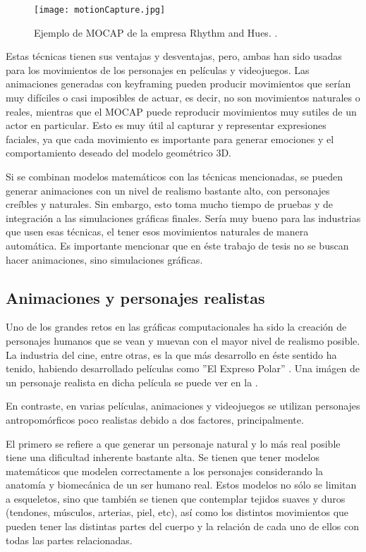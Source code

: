 \begin{figure}[!ht]
	\centering
		\texttt{[image: motionCapture.jpg]}
	\caption[Ejemplo de captura de movimiento.]{Ejemplo de MOCAP de la empresa Rhythm and Hues. \citep{motionCapture}.}
	\label{fig:motionCapture}
\end{figure}

Estas técnicas tienen sus ventajas y desventajas, pero, ambas han sido usadas para los movimientos de los personajes en películas y videojuegos. Las animaciones generadas con keyframing pueden producir movimientos que serían muy difíciles o casi imposibles de actuar, es decir, no son movimientos naturales o reales, mientras que el MOCAP puede reproducir movimientos muy sutiles de un actor en particular. Esto es muy útil al capturar y representar expresiones faciales, ya que cada movimiento es importante para generar emociones y el comportamiento deseado del modelo geométrico 3D.

Si se combinan modelos matemáticos con las técnicas mencionadas, se pueden generar animaciones con un nivel de realismo bastante alto, con personajes creíbles y naturales. Sin embargo, esto toma mucho tiempo de pruebas y de integración a las simulaciones gráficas finales. Sería muy bueno para las industrias que usen esas técnicas, el tener esos movimientos naturales de manera automática. Es importante mencionar que en éste trabajo de tesis no se buscan hacer animaciones, sino simulaciones gráficas.

\subsection{Animaciones y personajes realistas}

Uno de los grandes retos en las gráficas computacionales ha sido la creación de personajes humanos que se vean y muevan con el mayor nivel de realismo posible. La industria del cine, entre otras, es la que más desarrollo en éste sentido ha tenido, habiendo desarrollado películas como ''El Expreso Polar'' \citep{polarExpress}. Una imágen de un personaje realista en dicha película se puede ver en la .

En contraste, en varias películas, animaciones y videojuegos se utilizan personajes antropomórficos poco realistas debido a dos factores, principalmente.

El primero se refiere a que generar un personaje natural y lo más real posible tiene una dificultad inherente bastante alta. Se tienen que tener modelos matemáticos que modelen correctamente a los personajes considerando la anatomía y biomecánica de un ser humano real. Estos modelos no sólo se limitan a esqueletos, sino que también se tienen que contemplar tejidos suaves y duros (tendones, músculos, arterias, piel, etc), así como los distintos movimientos que pueden tener las distintas partes del cuerpo y la relación de cada uno de ellos con todas las partes relacionadas.

